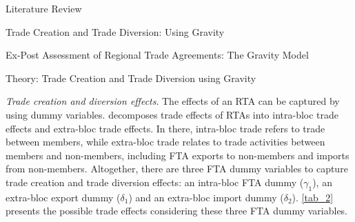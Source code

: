 \begin{section}{Literature Review}
\begin{subsection}{Trade Creation and Trade Diversion: Using Gravity}
\begin{subsubsection}{Ex-Post Assessment of Regional Trade Agreements: The Gravity Model}
\end{subsubsection}

\begin{subsubsection}{Theory: Trade Creation and Trade Diversion using Gravity}

\textit{Trade creation and diversion effects}. The effects of an RTA can be captured by using dummy variables. \cite{carrere_2006} decomposes trade effects of RTAs into intra-bloc trade effects and extra-bloc trade effects. In there, intra-bloc trade refers to trade between members, while extra-bloc trade relates to trade activities between members and non-members, including FTA exports to non-members and imports from non-members. Altogether, there are three FTA dummy variables to capture trade creation and trade diversion effects: an intra-bloc FTA dummy ($\gamma_{1}$), an extra-bloc export dummy ($\delta_{1}$) and an extra-bloc import dummy ($\delta_{2}$). \autoref{tab_2} presents the possible trade effects considering these three FTA dummy variables.


\end{subsubsection}
\end{subsection}
\end{section}
